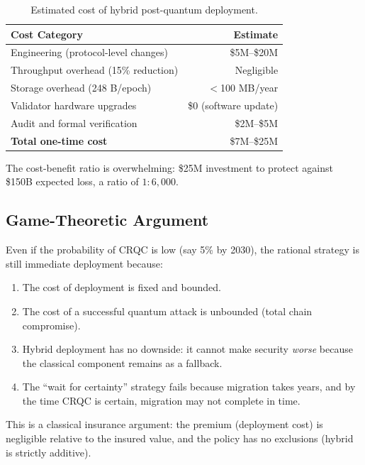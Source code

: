 \documentclass[11pt,a4paper]{article}
\begin{document}
\begin{table}[ht]
\centering
\caption{Estimated cost of hybrid post-quantum deployment.}
\label{tab:migration-cost}
\begin{tabular}{lr}
\toprule
\textbf{Cost Category} & \textbf{Estimate} \\
\midrule
Engineering (protocol-level changes) & \$5M--\$20M \\
Throughput overhead (15\% reduction) & Negligible \\
Storage overhead (248 B/epoch) & $<$100 MB/year \\
Validator hardware upgrades & \$0 (software update) \\
Audit and formal verification & \$2M--\$5M \\
\midrule
\textbf{Total one-time cost} & \$7M--\$25M \\
\bottomrule
\end{tabular}
\end{table}

The cost-benefit ratio is overwhelming: \$25M investment to protect against \$150B
expected loss, a ratio of $1:6{,}000$.

\subsection{Game-Theoretic Argument}

Even if the probability of CRQC is low (say 5\% by 2030), the rational strategy is
still immediate deployment because:

\begin{enumerate}[leftmargin=2em]
  \item The cost of deployment is fixed and bounded.
  \item The cost of a successful quantum attack is unbounded (total chain compromise).
  \item Hybrid deployment has no downside: it cannot make security \emph{worse} because
        the classical component remains as a fallback.
  \item The ``wait for certainty'' strategy fails because migration takes years, and
        by the time CRQC is certain, migration may not complete in time.
\end{enumerate}

This is a classical insurance argument: the premium (deployment cost) is negligible
relative to the insured value, and the policy has no exclusions (hybrid is strictly
additive).

\end{document}
